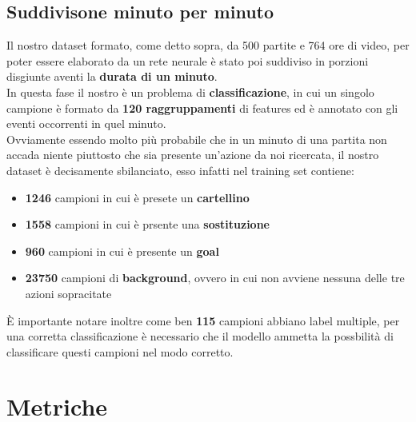 \subsection{Suddivisone minuto per minuto}
Il nostro dataset formato, come detto sopra, da 500 partite e 764 ore di video, per poter essere elaborato da un rete neurale è stato poi suddiviso in porzioni disgiunte aventi la \textbf{durata di un minuto}.
\\In questa fase il nostro è un problema di \textbf{classificazione}, in cui un singolo campione è formato da \textbf{120 raggruppamenti} di features ed è annotato con gli eventi occorrenti in quel minuto.
\\Ovviamente essendo molto più probabile che in un minuto di una partita non accada niente piuttosto che sia presente un'azione da noi ricercata, il nostro dataset è decisamente sbilanciato, esso infatti nel training set contiene:
\begin{itemize}
\item \textbf{1246} campioni in cui è presete un \textbf{cartellino}
\item \textbf{1558} campioni in cui è prsente una \textbf{sostituzione}
\item \textbf{960} campioni in cui è presente un \textbf{goal}
\item \textbf{23750} campioni di \textbf{background}, ovvero in cui non avviene nessuna delle tre azioni sopracitate
\end{itemize}
È importante notare inoltre come ben \textbf{115} campioni abbiano label multiple, per una corretta classificazione è necessario che il modello ammetta la possbilità di classificare questi campioni nel modo corretto.
\section{Metriche}
